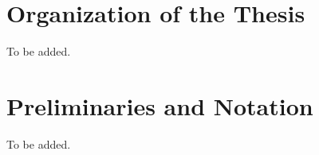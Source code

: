 \section{Organization of the Thesis}
To be added.


\section{Preliminaries and Notation}

To be added.

